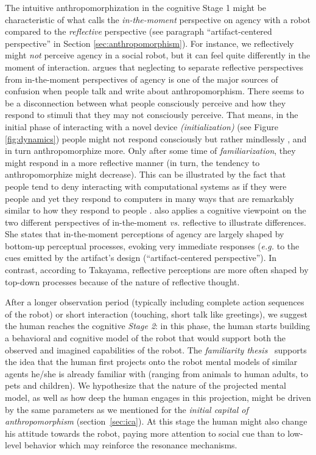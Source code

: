 \documentclass{frontiersSCNS} %
\newcommand{\eg}{\textit{e.g.}\xspace}
\newcommand{\vs}{\textit{vs.}\xspace}
\begin{document}
The intuitive anthropomorphization in the cognitive Stage 1 might be
characteristic of what \cite{takayama_perspectives_2012} calls the
\textit{in-the-moment} perspective on agency with a robot compared to the
\textit{reflective} perspective (see paragraph ``artifact-centered perspective''
in Section \ref{sec:anthropomorphism}).  For instance, we reflectively might
\textit{not} perceive agency in a social robot, but it can feel quite
differently in the moment of interaction. \cite{takayama_perspectives_2012}
argues that neglecting to separate reflective perspectives from in-the-moment
perspectives of agency is one of the major sources of confusion when people talk
and write about anthropomorphism. There seems to be a disconnection between what
people consciously perceive and how they respond to stimuli that they may not
consciously perceive. That means, in the initial phase of interacting with a
novel device \textit{(initialization)} (see Figure \ref{fig:dynamics}) people
might not respond consciously but rather mindlessly \citep{nass_machines_2000},
and in turn anthropomorphize more.  Only after some time of
\textit{familiarization}, they might respond in a more reflective manner (in
turn, the tendency to anthropomorphize might decrease). This can be illustrated
by the fact that people tend to deny interacting with computational systems as
if they were people and yet they respond to computers in many ways that are
remarkably similar to how they respond to people \citep{reeves_media_1996}.
\cite{takayama_perspectives_2012} also applies a cognitive viewpoint on the two
different perspectives of in-the-moment \vs reflective to illustrate
differences. She states that in-the-moment perceptions of agency are largely
shaped by bottom-up perceptual processes, evoking very immediate responses (\eg
to the cues emitted by the artifact's design (``artifact-centered
perspective''). In contrast, according to Takayama, reflective perceptions are
more often shaped by top-down processes because of the nature of reflective
thought.

After a longer observation period (typically including complete action sequences
of the robot) or short interaction (touching, short talk like greetings), we
suggest the human reaches the cognitive \emph{Stage 2}: in this phase, the human
starts building a behavioral and cognitive model of the robot that would support
both the observed and imagined capabilities of the robot.  The \emph{familiarity
thesis}~\cite{hegel_understanding_2008} supports the idea that the human first
projects onto the robot mental models of similar agents he/she is already
familiar with (ranging from animals to human adults, to pets and children). We
hypothesize that the nature of the projected mental model, as well as how deep
the human engages in this projection, might be driven by the same parameters as
we mentioned for the \emph{initial capital of anthropomorphism}
(section~\ref{sec:ica}).  At this stage the human might also change his attitude
towards the robot, paying more attention to social cue than to low-level
behavior which may reinforce the resonance mechanisms. 
\end{document}
